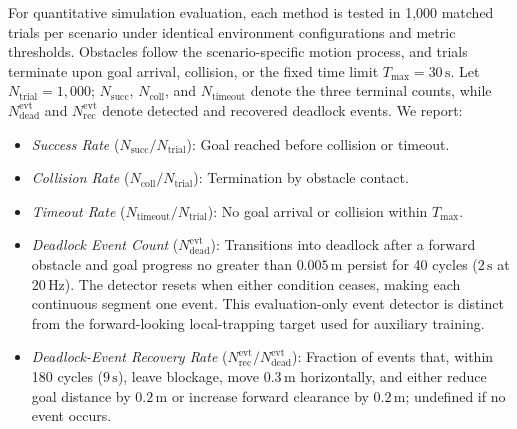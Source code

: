 \documentclass[letterpaper, 10 pt, conference]{ieeeconf}
\begin{document}
For quantitative simulation evaluation, each method is tested in 1,000 matched trials per scenario under identical environment configurations and metric thresholds. Obstacles follow the scenario-specific motion process, and trials terminate upon goal arrival, collision, or the fixed time limit $T_{\max}=30\,\text{s}$. Let $N_{\mathrm{trial}}=1{,}000$; $N_{\mathrm{succ}}$, $N_{\mathrm{coll}}$, and $N_{\mathrm{timeout}}$ denote the three terminal counts, while $N_{\mathrm{dead}}^{\mathrm{evt}}$ and $N_{\mathrm{rec}}^{\mathrm{evt}}$ denote detected and recovered deadlock events. We report:
\begin{itemize}[leftmargin=*,nosep]
    \item \textit{Success Rate} ($N_{\mathrm{succ}}/N_{\mathrm{trial}}$): Goal reached before collision or timeout.
    \item \textit{Collision Rate} ($N_{\mathrm{coll}}/N_{\mathrm{trial}}$): Termination by obstacle contact.
    \item \textit{Timeout Rate} ($N_{\mathrm{timeout}}/N_{\mathrm{trial}}$): No goal arrival or collision within $T_{\max}$.
    \item \textit{Deadlock Event Count} ($N_{\mathrm{dead}}^{\mathrm{evt}}$): Transitions into deadlock after a forward obstacle and goal progress no greater than $0.005\,\text{m}$ persist for 40 cycles ($2\,\text{s}$ at $20\,\text{Hz}$). The detector resets when either condition ceases, making each continuous segment one event. This evaluation-only event detector is distinct from the forward-looking local-trapping target used for auxiliary training.
    \item \textit{Deadlock-Event Recovery Rate} ($N_{\mathrm{rec}}^{\mathrm{evt}}/N_{\mathrm{dead}}^{\mathrm{evt}}$): Fraction of events that, within 180 cycles ($9\,\text{s}$), leave blockage, move $0.3\,\text{m}$ horizontally, and either reduce goal distance by $0.2\,\text{m}$ or increase forward clearance by $0.2\,\text{m}$; undefined if no event occurs.
\end{itemize}
\end{document}
